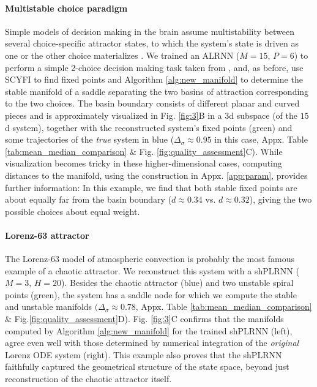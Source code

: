 \documentclass{article}
\theoremstyle{example}
\theoremstyle{plain}
\theoremstyle{definition}
\theoremstyle{remark}
\begin{document}
\paragraph{Multistable choice paradigm}
Simple models of decision making in the brain assume multistability between several choice-specific attractor states, to which the system's state is driven as one or the other choice materializes \citep{wang2002probabilistic}. We trained an ALRNN ($M=15$, $P=6$) \citep{brenner2024alrnn} to perform a simple 2-choice decision making task taken from \citep{gerstner2014neuronal}, and, as before, use SCYFI to find fixed points and Algorithm \ref{alg:new_manifold} to determine the stable manifold of a saddle separating the two basins of attraction corresponding to the two choices. The basin boundary consists of different planar and curved pieces and is approximately visualized in Fig. \ref{fig:3}B in a $3$d subspace (of the $15$d system), together with the reconstructed system's fixed points (green) and some trajectories of the \textit{true} system in blue ($\Delta_{\sigma}\approx0.95$ in this case, Appx. Table \ref{tab:mean_median_comparison} \& Fig. \ref{fig:quality_assessment}C). While visualization becomes tricky in these higher-dimensional cases, %
computing distances to the manifold, using the construction in Appx. \ref{app:param}, %
provides further information: In this example, we find that both stable fixed points are about equally far from the basin boundary ($d\approx0.34$ vs. $d\approx0.32$), giving the two possible choices about equal weight.


\paragraph{Lorenz-63 attractor}
The Lorenz-63 model of atmospheric convection is probably the most famous example of a chaotic attractor. We reconstruct this system with a shPLRNN ($M=3$, $H=20$). Besides the chaotic attractor (blue) and two unstable spiral points (green), the system has a saddle node for which we compute the stable and unstable manifolds $(\Delta_{\sigma}\approx0.78$, Appx. Table \ref{tab:mean_median_comparison} \& Fig.\ref{fig:quality_assessment}D). Fig. \ref{fig:3}C confirms that the manifolds computed by Algorithm \ref{alg:new_manifold} for the trained shPLRNN (left), agree even well with those determined by numerical %
integration of the \textit{original} Lorenz ODE system (right). This example also proves that the shPLRNN faithfully captured the geometrical structure of the state space, beyond just reconstruction of the chaotic attractor itself.
\end{document}
